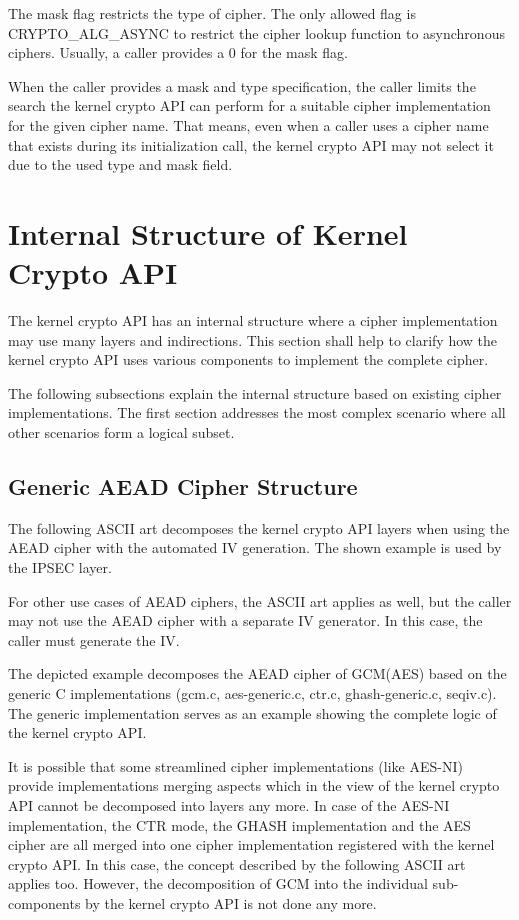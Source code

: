 \documentclass[a4paper,8pt,english]{sphinxmanual}
\begin{document}
The mask flag restricts the type of cipher. The only allowed flag is
CRYPTO\_ALG\_ASYNC to restrict the cipher lookup function to
asynchronous ciphers. Usually, a caller provides a 0 for the mask flag.

When the caller provides a mask and type specification, the caller
limits the search the kernel crypto API can perform for a suitable
cipher implementation for the given cipher name. That means, even when a
caller uses a cipher name that exists during its initialization call,
the kernel crypto API may not select it due to the used type and mask
field.


\section{Internal Structure of Kernel Crypto API}
\label{crypto/architecture:internal-structure-of-kernel-crypto-api}
The kernel crypto API has an internal structure where a cipher
implementation may use many layers and indirections. This section shall
help to clarify how the kernel crypto API uses various components to
implement the complete cipher.

The following subsections explain the internal structure based on
existing cipher implementations. The first section addresses the most
complex scenario where all other scenarios form a logical subset.


\subsection{Generic AEAD Cipher Structure}
\label{crypto/architecture:generic-aead-cipher-structure}
The following ASCII art decomposes the kernel crypto API layers when
using the AEAD cipher with the automated IV generation. The shown
example is used by the IPSEC layer.

For other use cases of AEAD ciphers, the ASCII art applies as well, but
the caller may not use the AEAD cipher with a separate IV generator. In
this case, the caller must generate the IV.

The depicted example decomposes the AEAD cipher of GCM(AES) based on the
generic C implementations (gcm.c, aes-generic.c, ctr.c, ghash-generic.c,
seqiv.c). The generic implementation serves as an example showing the
complete logic of the kernel crypto API.

It is possible that some streamlined cipher implementations (like
AES-NI) provide implementations merging aspects which in the view of the
kernel crypto API cannot be decomposed into layers any more. In case of
the AES-NI implementation, the CTR mode, the GHASH implementation and
the AES cipher are all merged into one cipher implementation registered
with the kernel crypto API. In this case, the concept described by the
following ASCII art applies too. However, the decomposition of GCM into
the individual sub-components by the kernel crypto API is not done any
more.
\end{document}
